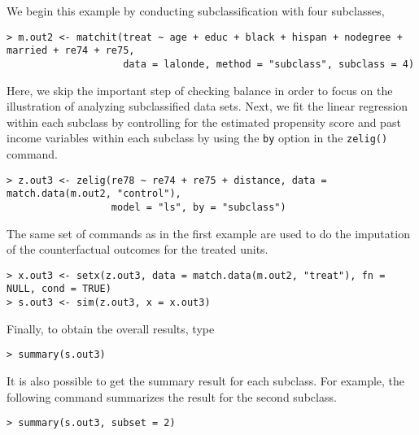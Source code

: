 \begin{enumerate}
  We begin this example by conducting subclassification with four
  subclasses,
\begin{verbatim}
> m.out2 <- matchit(treat ~ age + educ + black + hispan + nodegree + married + re74 + re75, 
                    data = lalonde, method = "subclass", subclass = 4)
\end{verbatim}
  Here, we skip the important step of checking balance in order to
  focus on the illustration of analyzing subclassified data sets.
  Next, we fit the linear regression within each subclass by
  controlling for the estimated propensity score and past income
  variables within each subclass by using the {\tt by} option in the
  {\tt zelig()} command.
\begin{verbatim}
> z.out3 <- zelig(re78 ~ re74 + re75 + distance, data = match.data(m.out2, "control"), 
                  model = "ls", by = "subclass")
\end{verbatim}
  The same set of commands as in the first example are used to do the
  imputation of the counterfactual outcomes for the treated units.
\begin{verbatim}
> x.out3 <- setx(z.out3, data = match.data(m.out2, "treat"), fn = NULL, cond = TRUE)
> s.out3 <- sim(z.out3, x = x.out3)
\end{verbatim}
Finally, to obtain the overall results, type
\begin{verbatim}
> summary(s.out3)
\end{verbatim}
It is also possible to get the summary result for each subclass. For
example, the following command summarizes the result for the second
subclass.
\begin{verbatim}
> summary(s.out3, subset = 2)
\end{verbatim}
  
\end{enumerate}

